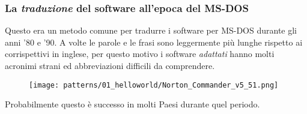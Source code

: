 \subsubsection{La \emph{traduzione} del software all'epoca del MS-DOS}

Questo era un metodo comune per tradurre i software per MS-DOS durante gli anni '80 e '90.
A volte le parole e le frasi sono leggermente più lunghe rispetto ai corrispettivi in inglese, per questo motivo i software \emph{adattati}
hanno molti acronimi strani ed abbreviazioni difficili da comprendere.

\begin{figure}[H]
\centering
\texttt{[image: patterns/01\_helloworld/Norton\_Commander\_v5\_51.png]}
\caption{\ITph{}}
\end{figure}

Probabilmente questo è successo in molti Paesi durante quel periodo.

